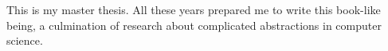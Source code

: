 


\begin{abstracts}        %


This is my master thesis. All these years prepared me to write this book-like being, a culmination of research about complicated abstractions in computer science.

\end{abstracts}


